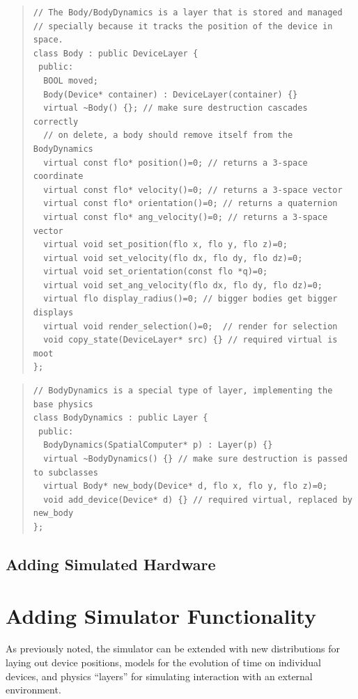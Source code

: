 \documentclass{article}
\begin{document}
\begin{quote}
\begin{verbatim}
// The Body/BodyDynamics is a layer that is stored and managed
// specially because it tracks the position of the device in space.
class Body : public DeviceLayer {
 public:
  BOOL moved;
  Body(Device* container) : DeviceLayer(container) {}
  virtual ~Body() {}; // make sure destruction cascades correctly
  // on delete, a body should remove itself from the BodyDynamics
  virtual const flo* position()=0; // returns a 3-space coordinate
  virtual const flo* velocity()=0; // returns a 3-space vector
  virtual const flo* orientation()=0; // returns a quaternion
  virtual const flo* ang_velocity()=0; // returns a 3-space vector
  virtual void set_position(flo x, flo y, flo z)=0;
  virtual void set_velocity(flo dx, flo dy, flo dz)=0;
  virtual void set_orientation(const flo *q)=0;
  virtual void set_ang_velocity(flo dx, flo dy, flo dz)=0;
  virtual flo display_radius()=0; // bigger bodies get bigger displays
  virtual void render_selection()=0;  // render for selection
  void copy_state(DeviceLayer* src) {} // required virtual is moot
};
\end{verbatim}
\end{quote}

\begin{quote}
\begin{verbatim}
// BodyDynamics is a special type of layer, implementing the base physics
class BodyDynamics : public Layer {
 public:
  BodyDynamics(SpatialComputer* p) : Layer(p) {}
  virtual ~BodyDynamics() {} // make sure destruction is passed to subclasses
  virtual Body* new_body(Device* d, flo x, flo y, flo z)=0;
  void add_device(Device* d) {} // required virtual, replaced by new_body
};
\end{verbatim}
\end{quote}

\subsection{Adding Simulated Hardware}

\section{Adding Simulator Functionality}

As previously noted, the simulator can be extended with new
distributions for laying out device positions, models for the
evolution of time on individual devices, and physics ``layers'' for
simulating interaction with an external environment.  
\end{document}
